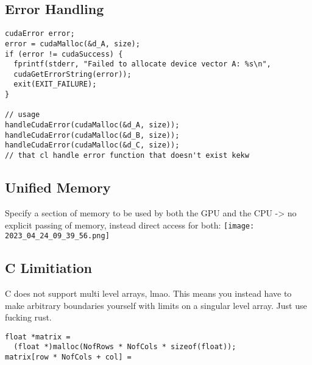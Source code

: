 \documentclass[main.tex,fontsize=8pt,paper=a4,paper=portrait,DIV=calc,]{scrartcl}
\begin{document}
\subsection{Error Handling}
\begin{lstlisting}
cudaError error;
error = cudaMalloc(&d_A, size);
if (error != cudaSuccess) {
  fprintf(stderr, "Failed to allocate device vector A: %s\n",
  cudaGetErrorString(error));
  exit(EXIT_FAILURE);
}

// usage 
handleCudaError(cudaMalloc(&d_A, size));
handleCudaError(cudaMalloc(&d_B, size));
handleCudaError(cudaMalloc(&d_C, size));
// that cl handle error function that doesn't exist kekw
\end{lstlisting}

\subsection{Unified Memory}
Specify a section of memory to be used by both the GPU and the CPU -> no explicit passing of memory, instead direct access for both:\newline
\texttt{[image: 2023\_04\_24\_09\_39\_56.png]}

\subsection{C Limitiation}
C does not support multi level arrays, lmao. This means you instead have to make arbitrary boundaries yourself with limits on a singular level array.\newline
Just use fucking rust.
\begin{lstlisting}
float *matrix =
  (float *)malloc(NofRows * NofCols * sizeof(float));
matrix[row * NofCols + col] =
\end{lstlisting}
\end{document}
